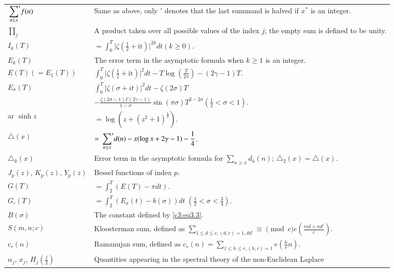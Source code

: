 \begin{longtable}{p{3cm}p{7cm}}
  $\displaystyle{\sideset{}{'}\sum_{n \leq x}} f(n)$ & Same as above,
  only $'$ denotes that the last summand is halved if $x^*$ is an
  integer.\\
  $\displaystyle{\prod_{j}}$ & A product taken over all possible
  values of the index $j$; the empty sum is defined to be unity.\\
  $I_k(T)$ & $= \displaystyle{\int^T_0 \Big| \zeta (\frac{1}{2}+
    \text{it})\Big|^{2k} dt} (k \geq 0)$.\\
  $E_k (T)$ & The error term in the asymptotic formula when $k \geq 1$
  is an integer.\\
  $E(T) (= E_1(T))$ & $\displaystyle{\int^T_0 \Big| \zeta(\frac{1}{2}
    + \text{it})\Big|^2} dt - T \log \left( \frac{T}{2 \pi}\right)- (2
  \gamma -1) T$.\\
  $E_\sigma (T)$ & $\displaystyle{\int^T_{0} \Big| \zeta(\sigma +
    it)\Big|^2 dt- \zeta (2 \sigma) T}$\\
  & $- \frac{\zeta (2 \sigma -1)\Gamma (2 \gamma -1)}{1- \sigma} \sin
  (\pi \sigma) T^{2- 2 \sigma} \left(\frac{1}{2} < \sigma < 1
  \right)$.\\
  ar $ \sinh z$ & $= \log (z+ (z^2 + 1)^{\frac{1}{2}})$.\\
  $\triangle (x)$ & $= \displaystyle{\sideset{}{'}\sum_{n \leq x}}
  d(n) - x(\log x + 2 \gamma -1)- \frac{1}{4}$.\\
  $\triangle_k (x)$ & Error term in the asymptotic formula for
  $\displaystyle{\sum_{n \geq x} d_k (n)}$; $\triangle_2 (x) =
  \triangle (x)$.\\
  $J_p (z)$, $K_p (z)$, $Y_p (z)$ & Bessel functions of index $p$.\\
  $G(T)$ & $ = \displaystyle{\int^T_{2}} (E(T)- \pi dt)$.\\
  $G_\circ (T)$ & $ = \displaystyle{\int^T_{2} (E_\sigma (t)- b (\sigma))
  dt \;  \left( \frac{1}{2} < \sigma < \frac{3}{4}\right)}$.\\
  $B(\sigma)$ & The constant defined by \eqref{c3:eq3.3}.\\
  $S(m, n; c)$ & Kloosterman sum, defined as   $\displaystyle{\sum_{1\leq d \leq c , (d,c)=1, dd'}} \equiv \pmod{c} e\left(\frac{md
      + nd'}{c}\right)$.\\
  $c_r (n)$ & Ramanujan sum, defined as $c_r (n)=
  \displaystyle{\sum_{1 \leq h \leq r, (h, r)=1}} e \left(\frac{h}{r}
  n \right)$. \\
  $\alpha_j$, $x_j$, $H_j \left( \frac{1}{2}\right)$ & Quantities
  appearing in the spectral theory of the non-Euclidean Laplace

\end{longtable}
